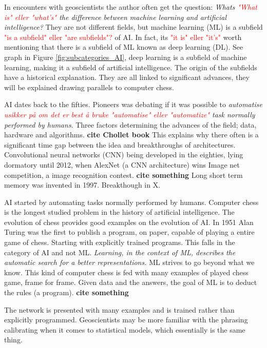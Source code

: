 \documentclass{article}
\begin{document}
In encounters with geoscientists the author often get the question: \textit{Whats \textcolor{red}{"What is" eller "what's"} the difference between machine learning and artificial intelligence?} They are not different fields, but machine learning (ML) is a subfield \textcolor{red}{"is a subfield" eller "are subfields"?} of AI. In fact, its \textcolor{red}{"it is" eller "it's"} worth mentioning that there is a subfield of ML known as deep learning (DL). See graph in Figure \ref{fig:subcategories_AI}, deep learning is a subfield of machine learning, making it a subfield of artificial intelligence. %
The origin of the subfields have a historical explanation. They are all linked to significant advances, they will be explained drawing parallels to computer chess. 

AI  dates back to the fifties. Pioneers was debating if it was possible to \textit{automatise \textcolor{red}{usikker på om det er best å bruke "automatise" eller "automatize"} task normally performed by humans}. Three factors determining the advances of the field; data, hardware and algorithms. \textbf{cite Chollet book} This explains why there often is a significant time gap between the idea and breakthroughs of architectures. Convolutional neural networks (CNN) being developed in the eighties, lying dormatory until 2012, when AlexNet (a CNN architecture) wins Image net competition, a image recognition contest. \textbf{cite something} Long short term memory was invented in 1997. Breakthough in X. 

AI started by automating tasks normally performed by humans. Computer chess is the longest studied problem in the history of artificial intelligence. The evolution of chess provides good examples on the evolution of AI.
In 1951 Alan Turing was the first to publish a program, on paper, capable of playing a entire game of chess.
Starting with explicitly trained programs. This falls in the category of AI and not ML. \textit{Learning, in the context of ML, describes the automatic search for a better representations.} ML strives to go beyond what we know. This kind of computer chess is fed with many examples of played chess game, frame for frame. Given data and the answers, the goal of ML is to deduct the rules (a program). \textbf{cite something}

The network is presented with many examples and is trained rather than explicitly programmed. Geoscientists may be more familiar with the phrasing calibrating when it comes to statistical models, which essentially is the same thing.
\end{document}
